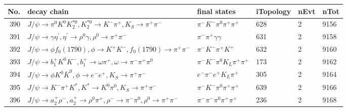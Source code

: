 \begin{table}[htbp] 
\begin{center}
\begin{small}
\begin{tabular}{rlllll}\hline\hline
 No. & decay chain & final states &  iTopology & nEvt & nTot \\\hline
390&$J/\psi       \rightarrow \pi^{0}        K^{0}          K_2^{*0}       , K_2^{*0}        \rightarrow K^{-}          \pi^{+}        , K_{S}           \rightarrow \pi^{+}        \pi^{-}        $&$\pi^{-}        K^{-}          \pi^{0}        \pi^{+}        \pi^{+}        $&  628&    2& 9156\\
391&$J/\psi       \rightarrow \gamma       \eta^{\prime} , \eta^{\prime}  \rightarrow \rho^{0}      \gamma       , \rho^{0}       \rightarrow \pi^{+}        \pi^{-}        $&$\pi^{-}        \pi^{+}        \gamma       \gamma       $&  631&    2& 9158\\
392&$J/\psi       \rightarrow \phi           f_{0}(1790)    , \phi            \rightarrow K^{+}          K^{-}          , f_{0}(1790)     \rightarrow \pi^{+}        \pi^{-}        $&$\pi^{-}        K^{-}          \pi^{+}        K^{+}          $&  632&    2& 9160\\
393&$J/\psi       \rightarrow b_{1}^{+}      K^{0}          K^{-}          , b_{1}^{+}       \rightarrow \omega         \pi^{+}        , \omega          \rightarrow \pi^{-}        \pi^{+}        \pi^{0}        $&$\pi^{-}        K^{-}          \pi^{0}        K_{L}          \pi^{+}        \pi^{+}        $&  173&    2& 9162\\
394&$J/\psi       \rightarrow \phi           K^{0}          \bar{K}^{0}   , \phi            \rightarrow e^{-}        e^{+}        , K_{S}           \rightarrow \pi^{+}        \pi^{-}        $&$e^{-}        \pi^{-}        e^{+}        K_{L}          \pi^{+}        $&  305&    2& 9164\\
395&$J/\psi       \rightarrow K^{-}          \pi^{+}        K^{*}          , K^{*}           \rightarrow K^{0}          \pi^{0}        , K_{S}           \rightarrow \pi^{+}        \pi^{-}        $&$\pi^{-}        K^{-}          \pi^{0}        \pi^{+}        \pi^{+}        $&  639&    2& 9166\\
396&$J/\psi       \rightarrow a_{2}^{+}      \rho^{-}      , a_{2}^{+}       \rightarrow \rho^{0}      \pi^{+}        , \rho^{-}       \rightarrow \pi^{-}        \pi^{0}        , \rho^{0}       \rightarrow \pi^{+}        \pi^{-}        $&$\pi^{-}        \pi^{-}        \pi^{0}        \pi^{+}        \pi^{+}        $&  236&    2& 9168\\

\end{tabular}
\end{small}
\end{center}
\end{table}
